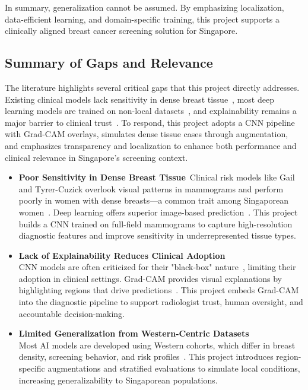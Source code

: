 \documentclass[12pt]{article}
\begin{document}
In summary, generalization cannot be assumed. By emphasizing localization, data-efficient learning, and domain-specific training, this project supports a clinically aligned breast cancer screening solution for Singapore.

\subsection{Summary of Gaps and Relevance}

The literature highlights several critical gaps that this project directly addresses. Existing clinical models lack sensitivity in dense breast tissue~\cite{1}, most deep learning models are trained on non-local datasets~\cite{6}, and explainability remains a major barrier to clinical trust~\cite{3,5}. To respond, this project adopts a CNN pipeline with Grad-CAM overlays, simulates dense tissue cases through augmentation, and emphasizes transparency and localization to enhance both performance and clinical relevance in Singapore’s screening context.

\begin{itemize}
\item \textbf{Poor Sensitivity in Dense Breast Tissue}\
Clinical risk models like Gail and Tyrer-Cuzick overlook visual patterns in mammograms and perform poorly in women with dense breasts—a common trait among Singaporean women~\cite{6}. Deep learning offers superior image-based prediction~\cite{1,7}. This project builds a CNN trained on full-field mammograms to capture high-resolution diagnostic features and improve sensitivity in underrepresented tissue types.

\item \textbf{Lack of Explainability Reduces Clinical Adoption}\\
CNN models are often criticized for their "black-box" nature~\cite{3,5}, limiting their adoption in clinical settings. Grad-CAM provides visual explanations by highlighting regions that drive predictions~\cite{5}. This project embeds Grad-CAM into the diagnostic pipeline to support radiologist trust, human oversight, and accountable decision-making.

\item \textbf{Limited Generalization from Western-Centric Datasets}\\
Most AI models are developed using Western cohorts, which differ in breast density, screening behavior, and risk profiles~\cite{6}. This project introduces region-specific augmentations and stratified evaluations to simulate local conditions, increasing generalizability to Singaporean populations.
\end{itemize}
\end{document}
